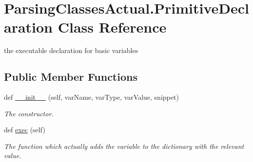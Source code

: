 \hypertarget{class_parsing_classes_actual_1_1_primitive_declaration}{}\section{Parsing\+Classes\+Actual.\+Primitive\+Declaration Class Reference}
\label{class_parsing_classes_actual_1_1_primitive_declaration}


the executable declaration for basic variables  


\subsection*{Public Member Functions}
\begin{DoxyCompactItemize}
\item 
def \hyperlink{class_parsing_classes_actual_1_1_primitive_declaration_a597dcbd2c1f074b88dc6ca01f2009983}{\+\_\+\+\_\+init\+\_\+\+\_\+} (self, var\+Name, var\+Type, var\+Value, snippet)
\begin{DoxyCompactList}\small\item\em The constructor. \end{DoxyCompactList}\item 
def \hyperlink{class_parsing_classes_actual_1_1_primitive_declaration_aeeab13c37fc60f2d86e9b72fb30de758}{exec} (self)\hypertarget{class_parsing_classes_actual_1_1_primitive_declaration_aeeab13c37fc60f2d86e9b72fb30de758}{}\label{class_parsing_classes_actual_1_1_primitive_declaration_aeeab13c37fc60f2d86e9b72fb30de758}

\begin{DoxyCompactList}\small\item\em The function which actually adds the variable to the dictionary with the relevant value. \end{DoxyCompactList}\end{DoxyCompactItemize}

